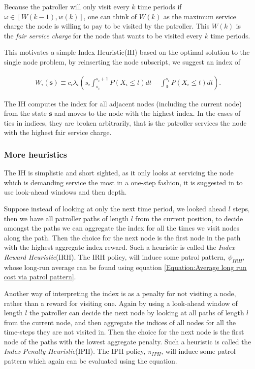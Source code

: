 \documentclass[a4paper,10pt]{article}
\theoremstyle{definition}
\theoremstyle{definition}
\theoremstyle{remark}
\theoremstyle{definition}
\begin{document}
Because the patroller will only visit every $k$ time periods if $\omega \in [W(k-1),w(k)]$, one can think of $W(k)$ as the maximum service charge the node is willing to pay to be visited by the patroller. This $W(k)$ is the \textit{fair service charge} for the node that wants to be visited every $k$ time periods.  

This motivates a simple Index Heuristic(IH) based on the optimal solution to the single node problem, by reinserting the node subscript, we suggest an index of

\begin{align*}
W_{i}(\bm{s}) \equiv c_{i} \lambda_{i} \left(s_{i} \int_{s_{i}}^{s_{i}+1} P(X_{i} \leq t) dt - \int_{0}^{s_{i}} P(X_{i} \leq t) dt \right).
\end{align*}

The IH computes the index for all adjacent nodes (including the current node) from the state $\bm{s}$ and moves to the node with the highest index. In the cases of ties in indices, they are broken arbitrarily, that is the patroller services the node with the highest fair service charge.

\subsubsection{More heuristics}
The IH is simplistic and short sighted, as it only looks at servicing the node which is demanding service the most in a one-step fashion, it is suggested in \cite{Lin2013} to use look-ahead windows and then depth.

Suppose instead of looking at only the next time period, we looked ahead $l$ steps, then we have all patroller paths of length $l$ from the current position, to decide amongst the paths we can aggregate the index for all the times we visit nodes along the path. Then the choice for the next node is the first node in the path with the highest aggregate index reward. Such a heuristic is called the \textit{Index Reward Heuristic}(IRH). The IRH policy, will induce some patrol pattern, $\psi_{IRH}$, whose long-run average can be found using equation \ref{Equation:Average long run cost via patrol pattern}.

Another way of interpreting the index is as a penalty for not visiting a node, rather than a reward for visiting one. Again by using a look-ahead window of length $l$ the patroller can decide the next node by looking at all paths of length $l$ from the current node, and then aggregate the indices of all nodes for all the time-steps they are not visited in. Then the choice for the next node is the first node of the paths with the lowest aggregate penalty. Such a heuristic is called the \textit{Index Penalty Heuristic}(IPH). The IPH policy, $\pi_{IPH}$, will induce some patrol pattern which again can be evaluated using the equation.
\end{document}
